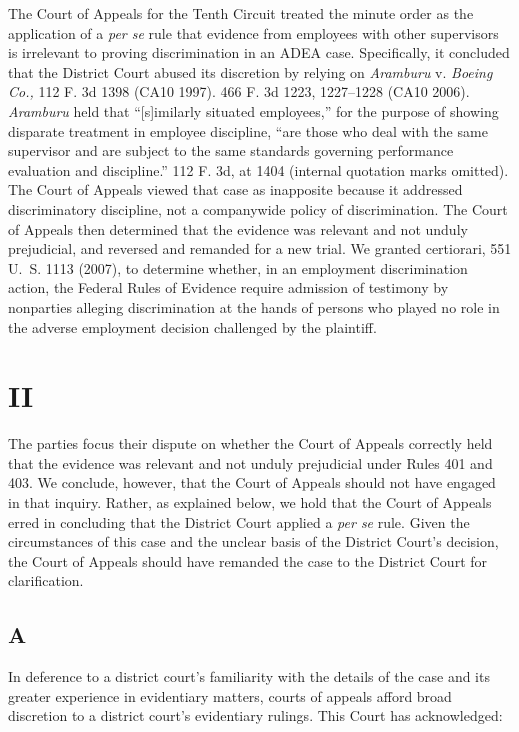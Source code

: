   The Court of Appeals for the Tenth Circuit treated the minute order
as the application of a \emph{per se} rule that evidence from employees
with other supervisors is irrelevant to proving discrimination in an
ADEA case. Specifically, it concluded that the District Court abused
its discretion by relying on \emph{Aramburu} v. \emph{Boeing Co.,} 112 F.
3d 1398 (CA10 1997). 466 F. 3d 1223, 1227--1228 (CA10 2006).
\emph{Aramburu} held that ``[s]imilarly situated employees,'' for the
purpose of showing disparate treatment in employee discipline, ``are
those who deal with the same supervisor and are subject to the same
standards governing performance evaluation and discipline.'' 112 F.
3d, at 1404 (internal quotation marks omitted). The Court of Appeals
viewed that case as inapposite because it addressed discriminatory
discipline, not a companywide policy of discrimination. The Court of
Appeals then determined that the evidence was relevant and not unduly
prejudicial, and reversed and remanded for a new trial. We granted
certiorari, 551 U.~S. 1113 (2007), to determine whether, in an
employment discrimination action, the Federal Rules of Evidence require
admission of testimony by nonparties alleging discrimination at the
hands of persons who played no role in the adverse employment decision
challenged by the plaintiff.

\section{II}

  The parties focus their dispute on whether the Court of Appeals
correctly held that the evidence was relevant and not unduly prejudicial
under Rules 401 and 403. We conclude, however, that the Court of Appeals
should not have engaged in that inquiry. Rather, as explained below, we
hold that the Court of Appeals erred in concluding that the District
Court applied a \emph{per se} rule. Given the circumstances of this case
and the unclear basis of the District \newpage  Court's decision, the
Court of Appeals should have remanded the case to the District Court for
clarification.

\subsection{A}

  In deference to a district court's familiarity with the details of
the case and its greater experience in evidentiary matters, courts of
appeals afford broad discretion to a district court's evidentiary
rulings. This Court has acknowledged:

